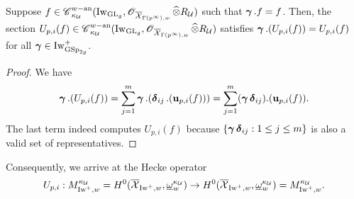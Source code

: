 \begin{Lemma}
Suppose $f\in \scrC_{\kappa_{\calU}}^{w-\an}(\Iw_{\GL_g}, \scrO_{\overline{\calX}_{\Gamma(p^{\infty}), w}}\widehat{\otimes} R_{\calU})$ such that $\bfgamma . f = f$. Then, the section $U_{p,i}(f)\in \scrC^{w-\an}_{\kappa_{\calU}}(\Iw_{\GL_g}, \scrO_{\overline{\calX}_{\Gamma(p^{\infty}),w}}\widehat{\otimes}R_{\calU})$ satisfies $\bfgamma.(U_{p,i}(f))=U_{p,i}(f)$ for all $\bfgamma\in \Iw^+_{\GSp_{2g}}$.
\end{Lemma}

\begin{proof}
We have $$\bfgamma.(U_{p,i}(f))=\sum_{j=1}^m \bfgamma.(\bfdelta_{ij}.(\bfu_{p,i}(f)))=\sum_{j=1}^m (\bfgamma\bfdelta_{ij}).(\bfu_{p,i}(f)).$$
The last term indeed computes $U_{p,i}(f)$ because $\{\bfgamma\bfdelta_{ij}: 1\leq j \leq m\}$ is also a valid set of representatives.
\end{proof}

Consequently, we arrive at the Hecke operator $$U_{p,i}: M_{\Iw^+, w}^{\kappa_{\calU}}=H^0(\overline{\calX}_{\Iw^+,w}, \underline{\omega}^{\kappa_{\calU}}_w)\rightarrow H^0(\overline{\calX}_{\Iw^+,w}, \underline{\omega}^{\kappa_{\calU}}_w)= M_{\Iw^+, w}^{\kappa_{\calU}}.$$

